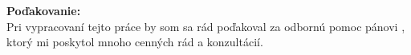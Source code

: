 \begin{flushleft}
    \textbf{Poďakovanie:}\\
    \vspace{1em}
Pri vypracovaní tejto práce by som sa rád poďakoval za odbornú pomoc pánovi \supervisor, ktorý mi poskytol mnoho cenných rád a konzultácií. 
\end{flushleft}

